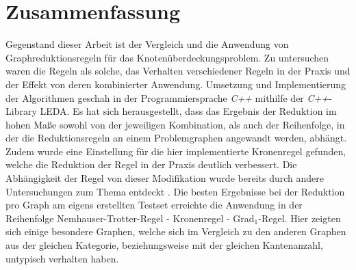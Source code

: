 \chapter*{Zusammenfassung}
Gegenstand dieser Arbeit ist der Vergleich und die Anwendung von Graphreduktionsregeln für das Knotenüberdeckungsproblem. Zu untersuchen waren die Regeln als solche, das Verhalten verschiedener Regeln in der Praxis und der Effekt von deren kombinierter Anwendung. Umsetzung und Implementierung der Algorithmen geschah in der Programmiersprache \emph{C++} mithilfe der \emph{C++}-Library LEDA. Es hat sich herausgestellt, dass das Ergebnis der Reduktion im hohen Maße sowohl von der jeweiligen Kombination, als auch der Reihenfolge, in der die Reduktionsregeln an einem Problemgraphen angewandt werden, abhängt. Zudem wurde eine Einstellung für die hier implementierte Kronenregel gefunden, welche die Reduktion der Regel in der Praxis deutlich verbessert. Die Abhängigkeit der Regel von dieser Modifikation wurde bereits durch andere Untersuchungen zum Thema entdeckt \cite{paper:7}. Die besten Ergebnisse bei der Reduktion pro Graph am eigens erstellten Testset erreichte die Anwendung in der Reihenfolge Nemhauser-Trotter-Regel - Kronenregel - Grad$_{1}$-Regel. Hier zeigten sich einige besondere Graphen, welche sich im Vergleich zu den anderen Graphen aus der gleichen Kategorie, beziehungsweise mit der gleichen Kantenanzahl, untypisch verhalten haben. 